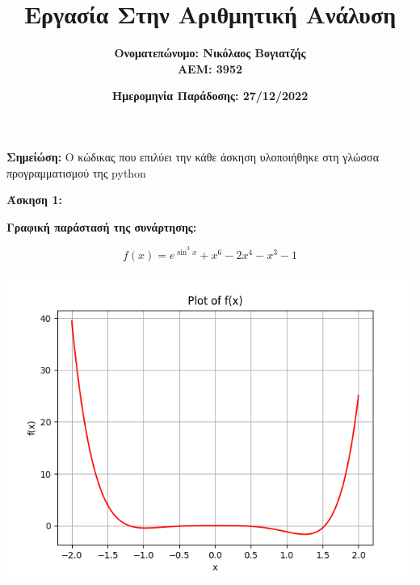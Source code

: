 \documentclass{article}
\title{\textbf{Εργασία Στην Αριθμητική Ανάλυση}}
\author{\textbf{Ονοματεπώνυμο: Νικόλαος Βογιατζής} \\ \textbf{ΑΕΜ: 3952}}
\date{\textbf{Ημερομηνία Παράδοσης: 27/12/2022}}
\begin{document}
\maketitle
\textbf{Σημείώση:} Ο κώδικας που επιλύει την κάθε άσκηση υλοποιήθηκε στη γλώσσα προγραμματισμού της python\\
\par\textbf{\large{Άσκηση 1:}}\\
\par
\textbf{\large{Γραφική παράστασή της συνάρτησης:}}

\begin{equation*}
    f(x) =  e^{\sin^3x} + x^6 -2x^4 -x^3 -1
\end{equation*}

\begin{center}
\includegraphics[width=.9\linewidth]{ex1_plot.png}
\end{center}
\newpage
\end{document}

